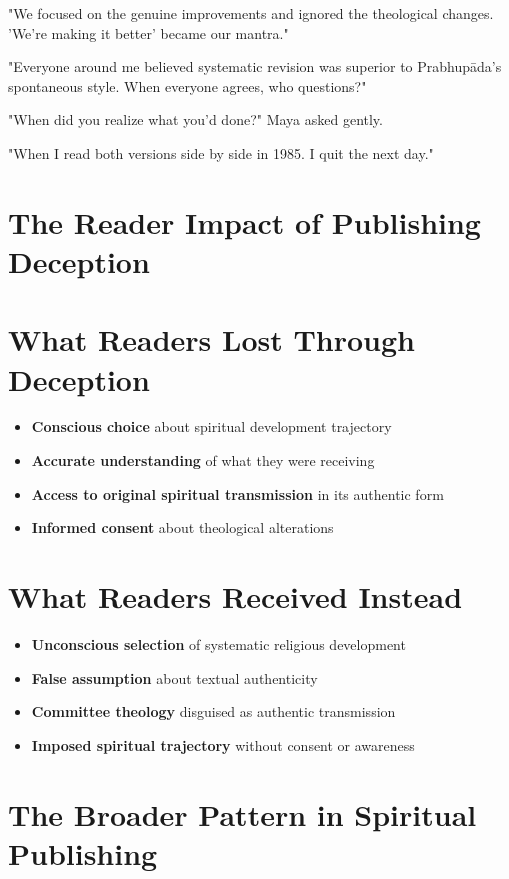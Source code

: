\documentclass[11pt,twoside]{book}
\begin{document}
"We focused on the genuine improvements and ignored the theological changes. 'We're making it better' became our mantra."

"Everyone around me believed systematic revision was superior to Prabhupāda's spontaneous style. When everyone agrees, who questions?"

"When did you realize what you'd done?" Maya asked gently.

"When I read both versions side by side in 1985. I quit the next day."
\section*{The Reader Impact of Publishing Deception}
\label{sec:org9226d93}

\section*{What Readers Lost Through Deception}
\label{sec:org40fe153}
\begin{itemize}
\item \textbf{\textbf{Conscious choice}} about spiritual development trajectory
\item \textbf{\textbf{Accurate understanding}} of what they were receiving
\item \textbf{\textbf{Access to original spiritual transmission}} in its authentic form
\item \textbf{\textbf{Informed consent}} about theological alterations
\end{itemize}
\section*{What Readers Received Instead}
\label{sec:org13ac2e9}
\begin{itemize}
\item \textbf{\textbf{Unconscious selection}} of systematic religious development
\item \textbf{\textbf{False assumption}} about textual authenticity
\item \textbf{\textbf{Committee theology}} disguised as authentic transmission
\item \textbf{\textbf{Imposed spiritual trajectory}} without consent or awareness
\end{itemize}
\section*{The Broader Pattern in Spiritual Publishing}
\label{sec:org6a92782}
\end{document}

